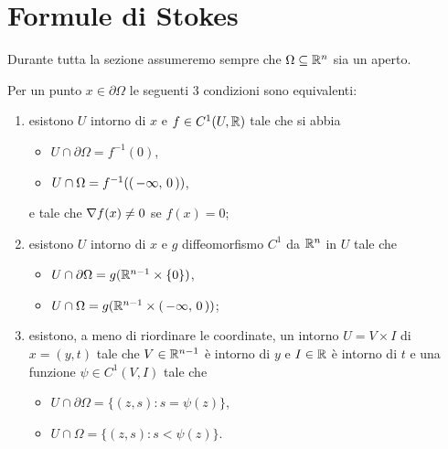 \section{Formule di Stokes}\label{sezione:FormuleStokes}

Durante tutta la sezione assumeremo sempre che $\Omega\subseteq\mathbb R^n$ sia un aperto.

\begin{theorem}\label{thm:PtRegEquiv}
	Per un punto $x\in \partial \Omega$ le seguenti $3$ condizioni sono equivalenti:
	\begin{enumerate}
		\item esistono $U$ intorno di $x$ e $f\in C^1(U,\mathbb R)$ tale che si abbia
			\begin{itemize}
				\item $U\cap \partial \Omega=f^{-1}(0)$,
				\item $U\cap \Omega=f^{-1}(\left(\,-\infty,\,0\,\right))$,
			\end{itemize}
			e tale che $\nabla f(x)\neq 0$ se $f(x)=0$;\label{PRE:i}
		\item esistono $U$ intorno di $x$ e $g$ diffeomorfismo $C^1$ da $\mathbb R^n$ in $U$ tale che\label{PRE:ii}
			\begin{itemize}
				\item $U\cap \partial \Omega = g(\mathbb R^{n-1}\times\{0\})$,
				\item $U\cap \Omega = g(\mathbb R^{n-1}\times\left(\,-\infty,\,0\,\right))$;
			\end{itemize}
		\item esistono, a meno di riordinare le coordinate, un intorno $U=V\times I$ di $x=(y,t)$ tale che $V\in\mathbb R^{n-1}$ è intorno di $y$
			e $I\in\mathbb R$ è intorno di $t$ e una funzione $\psi\in C^1(V,I)$ tale che
			\begin{itemize}
				\item $U\cap \partial \Omega = \{(z,s):s=\psi(z)\}$,
				\item $U\cap \Omega = \{(z,s):s<\psi(z)\}$.
			\end{itemize}\label{PRE:iii}
	\end{enumerate}
\end{theorem}

